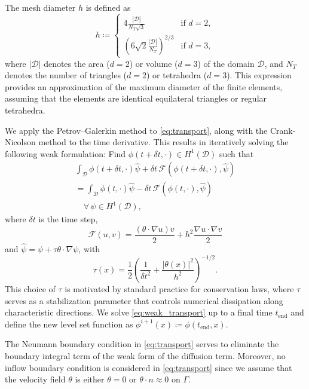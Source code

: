 \documentclass[iicol,pdflatex,sn-mathphys-ay]{sn-jnl}%
\theoremstyle{thmstyleone}%
\theoremstyle{thmstyletwo}%
\theoremstyle{thmstylethree}%
\begin{document}
The mesh diameter $h$ is defined as
\[
	h\coloneqq
	\begin{cases}
		4\frac{\left|\mathcal{D}\right|}{N_T\sqrt{3}}
			& \text{if } d = 2,\\
		\left(6\sqrt{2}\frac{\left|\mathcal{D}\right|}{N_T}\right)^{2/3}
			& \text{if } d = 3,
	\end{cases}
\]
where $\left|\mathcal{D}\right|$ denotes the area ($d=2$) or volume ($d=3$)
of the domain $\mathcal{D}$, and $N_T$ denotes the number of triangles ($d=2$) 
or tetrahedra ($d=3$).
This expression provides an approximation of
the maximum diameter of the finite elements,
assuming that the elements are identical equilateral triangles
or regular tetrahedra.

We apply the Petrov--Galerkin method \cite{MR1640142} to \eqref{eq:transport},
along with the Crank-Nicolson method to the time derivative.
This results in iteratively solving the following weak formulation:
Find $\phi(t+\delta t,\cdot)\in H^1(\mathcal{D})$ such that
\begin{equation}\label{eq:weak_transport}
\begin{aligned}
	\int_{\mathcal{D}} \phi(t+\delta t,\cdot)\hat{\psi} +
		\delta t \, \mathcal{F}(\phi(t+\delta t,\cdot), \hat{\psi})\\
	= \int_{\mathcal{D}} \phi(t,\cdot) \hat{\psi} -
		\delta t \, \mathcal{F}(\phi(t,\cdot), \hat{\psi})\\
	\quad\forall \, \psi\in H^1(\mathcal{D}),
\end{aligned}	
\end{equation}
where $\delta t$ is the time step,
\[
	\mathcal{F}(u,v)=\frac{(\theta \cdot \nabla u) v}{2}
	+ h^2\frac{\nabla u \cdot \nabla v}{2}
\]
and $\hat{\psi}=\psi+\tau \theta\cdot\nabla\psi$, with 
\begin{equation}\label{eq:tau_lv}
	\tau(x) = \frac{1}{2}\left(\frac{1}{\delta t^2}
	+ \frac{|\theta(x)|^2}{h^2}\right)^{-1/2}.
\end{equation}
This choice of $\tau$ is motivated by standard practice for conservation laws,
where $\tau$ serves as a stabilization parameter that controls
numerical dissipation along characteristic directions.
We solve \eqref{eq:weak_transport} up to a final time $t_{\text{end}}$ and
define the new level set function as
$\phi^{i+1}(x)\coloneqq\phi(t_\text{end},x)$.

The Neumann boundary condition in \eqref{eq:transport} serves to eliminate
the boundary integral term of the weak form of the diffusion term.
Moreover, no inflow boundary condition is considered in \eqref{eq:transport}
since we assume that the velocity field $\theta$ is either $\theta = 0$ 
or $\theta \cdot n \approx 0$ on $\Gamma$.
\end{document}
